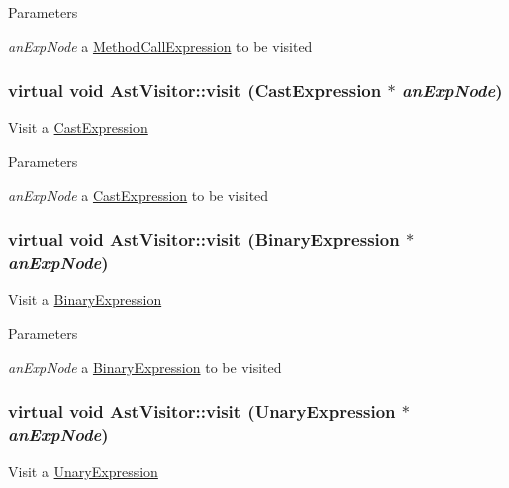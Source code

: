 \begin{DoxyParams}{Parameters}
\item[{\em anExpNode}]a \hyperlink{classMethodCallExpression}{MethodCallExpression} to be visited \end{DoxyParams}
\hypertarget{classAstVisitor_a2b90ef6f1a66a690b66c03b700a5a6bf}{
\subsubsection[{visit}]{\setlength{\rightskip}{0pt plus 5cm}virtual void AstVisitor::visit ({\bf CastExpression} $\ast$ {\em anExpNode})}}
\label{classAstVisitor_a2b90ef6f1a66a690b66c03b700a5a6bf}
Visit a \hyperlink{classCastExpression}{CastExpression}


\begin{DoxyParams}{Parameters}
\item[{\em anExpNode}]a \hyperlink{classCastExpression}{CastExpression} to be visited \end{DoxyParams}
\hypertarget{classAstVisitor_a9b135e2823d8aab8a832478fd90ebf8c}{
\subsubsection[{visit}]{\setlength{\rightskip}{0pt plus 5cm}virtual void AstVisitor::visit ({\bf BinaryExpression} $\ast$ {\em anExpNode})}}
\label{classAstVisitor_a9b135e2823d8aab8a832478fd90ebf8c}
Visit a \hyperlink{classBinaryExpression}{BinaryExpression}


\begin{DoxyParams}{Parameters}
\item[{\em anExpNode}]a \hyperlink{classBinaryExpression}{BinaryExpression} to be visited \end{DoxyParams}
\hypertarget{classAstVisitor_ab1c2fc3a9145d871b7f8a502324b58a7}{
\subsubsection[{visit}]{\setlength{\rightskip}{0pt plus 5cm}virtual void AstVisitor::visit ({\bf UnaryExpression} $\ast$ {\em anExpNode})}}
\label{classAstVisitor_ab1c2fc3a9145d871b7f8a502324b58a7}
Visit a \hyperlink{classUnaryExpression}{UnaryExpression}


